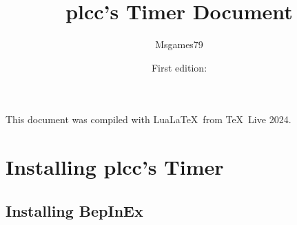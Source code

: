 \documentclass[lualatex,a4paper,fontsize=11pt,jafontscale=0.9247,titlepage,oneside]{jlreq}
\begin{document}
\title{plcc's Timer Document}
\author{Msgames79}
\date{First edition:\;\todayen}
\maketitle
This document was compiled with Lua\LaTeX\ from \TeX\ Live 2024.
\tableofcontents
\clearpage
\section{Installing plcc's Timer}
\subsection{Installing BepInEx}
\end{document}

